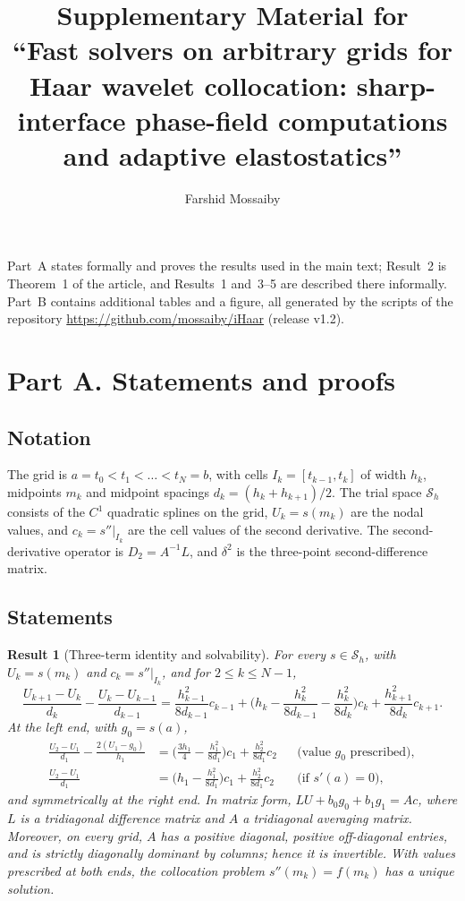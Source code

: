 \documentclass[11pt]{article}
\title{Supplementary Material for\\ ``Fast solvers on arbitrary grids for Haar wavelet collocation: sharp-interface phase-field computations and adaptive elastostatics''}
\author{Farshid Mossaiby}
\date{}
\newif\ifincludeproof \includeprooftrue
\newtheorem{result}{Result}
\begin{document}
\maketitle
\noindent Part~A states formally and proves the results used in the main text; Result~2 is Theorem~1 of the article, and Results~1 and~3--5 are described there informally. Part~B contains additional
tables and a figure, all generated by the scripts of the repository \url{https://github.com/mossaiby/iHaar} (release v1.2).

\ifincludeproof
\section*{Part A. Statements and proofs}
\subsection*{Notation}
The grid is $a=t_0<t_1<\dots<t_N=b$, with cells $I_k=[t_{k-1},t_k]$ of width $h_k$, midpoints $m_k$ and midpoint
spacings $d_k=(h_k+h_{k+1})/2$. The trial space $\mathcal S_h$ consists of the $C^1$ quadratic splines on the
grid, $U_k=s(m_k)$ are the nodal values, and $c_k=s''|_{I_k}$ are the cell values of the second derivative.
The second-derivative operator is $D_2=A^{-1}L$, and $\delta^2$ is the three-point second-difference matrix.

\subsection*{Statements}
\begin{result}[Three-term identity and solvability]\label{thm:identity}
For every $s\in\mathcal S_h$, with $U_k=s(m_k)$ and $c_k=s''|_{I_k}$, and for $2\le k\le N-1$,
\begin{equation}\label{eq:interior}
\frac{U_{k+1}-U_k}{d_k}-\frac{U_k-U_{k-1}}{d_{k-1}}
=\frac{h_{k-1}^2}{8d_{k-1}}c_{k-1}+\Big(h_k-\frac{h_k^2}{8d_{k-1}}-\frac{h_k^2}{8d_k}\Big)c_k+\frac{h_{k+1}^2}{8d_k}c_{k+1}.
\end{equation}
At the left end, with $g_0=s(a)$,
\begin{align}
\frac{U_2-U_1}{d_1}-\frac{2(U_1-g_0)}{h_1}&=\Big(\frac{3h_1}{4}-\frac{h_1^2}{8d_1}\Big)c_1+\frac{h_2^2}{8d_1}c_2 &&\text{(value $g_0$ prescribed)},\label{eq:dirrow}\\
\frac{U_2-U_1}{d_1}&=\Big(h_1-\frac{h_1^2}{8d_1}\Big)c_1+\frac{h_2^2}{8d_1}c_2 &&\text{(if } s'(a)=0),\label{eq:neurow}
\end{align}
and symmetrically at the right end. In matrix form, $LU+b_0g_0+b_1g_1=Ac$, where $L$ is a tridiagonal
difference matrix and $A$ a tridiagonal averaging matrix.
Moreover, on every grid, $A$ has a positive diagonal, positive off-diagonal entries, and is strictly diagonally
dominant by columns; hence it is invertible. With values prescribed at both ends, the collocation
problem $s''(m_k)=f(m_k)$ has a unique solution.
\end{result}
\end{document}

